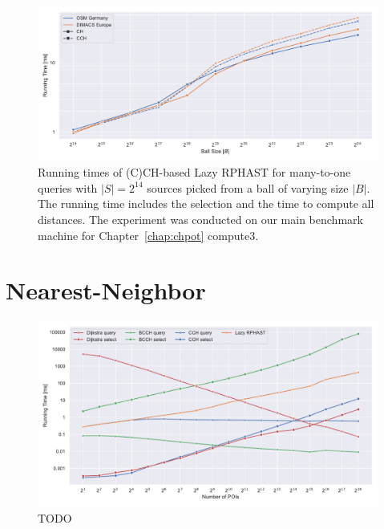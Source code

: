 \documentclass[a4paper, english, cleveref]{lipics-v2021}
\begin{document}
\begin{figure}
\centering
\includegraphics[width=\linewidth]{fig/lazy_rphast_many_to_one_both.pdf}
\caption{
Running times of (C)CH-based Lazy RPHAST for many-to-one queries with $|S| = 2^{14}$ sources picked from a ball of varying size $|B|$.
The running time includes the selection and the time to compute all distances.
The experiment was conducted on our main benchmark machine for Chapter~\ref{chap:chpot} compute3.
}\label{fig:many_to_one_ch_vs_cch}
\end{figure}

\begin{table}
\setlength{\tabcolsep}{3pt}
\centering
\caption{
TODO
}\label{tab:cchpot_ops}

\end{table}

\section{Nearest-Neighbor}

\begin{figure}
\centering
\includegraphics[width=\linewidth]{fig/knn_ger.pdf}
\caption{
TODO
}\label{fig:knn_ger}
\end{figure}
\end{document}

